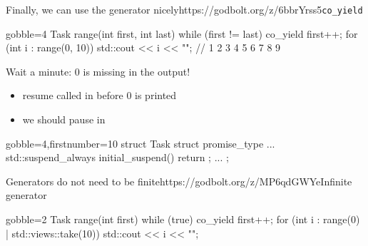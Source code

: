 \begin{frame}[fragile]
  \begin{exampleblockGB}{Finally, we can use the generator nicely}{https://godbolt.org/z/6bbrYrss5}{\texttt{co\_yield}}
    {\scriptsize
      \begin{cppcode*}{gobble=4}
        Task range(int first, int last) {
          while (first != last) {
            co_yield first++;
          }
        }
        for (int i : range(0, 10)) {
          std::cout << i << "";
        } // 1 2 3 4 5 6 7 8 9
      \end{cppcode*}
    }
  \end{exampleblockGB}
  \pause
  \begin{alertblock}{Wait a minute: 0 is missing in the output!}
    \begin{itemize}
    \item resume called in  before 0 is printed
    \item we should pause in 
    \end{itemize}
     {\scriptsize
      \begin{cppcode*}{gobble=4,firstnumber=10}
        struct Task {
          struct promise_type {
            ...
            std::suspend_always initial_suspend() { return {}; }
            ...
          }
        };
      \end{cppcode*}
    }
  \end{alertblock}
\end{frame}

\begin{frame}[fragile]
  \begin{exampleblockGB}{Generators do not need to be finite}{https://godbolt.org/z/MP6qdGWYe}{Infinite generator}
    \begin{cppcode*}{gobble=2}
      Task range(int first) {
        while (true) {
          co_yield first++;
        }
      }
      for (int i : range(0) | std::views::take(10)) {
        std::cout << i << "\n";
      }
    \end{cppcode*}
  \end{exampleblockGB}
\end{frame}

